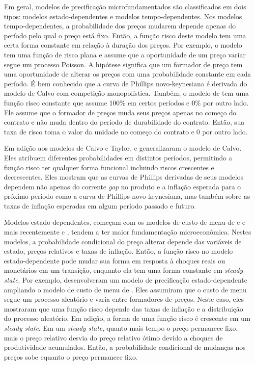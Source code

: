 \documentclass[twoside,a4paper,11pt]{report}
\begin{document}
Em geral, modelos de precificação microfundamentados são classificados em dois tipos: modelos estado-dependentes e modelos tempo-dependentes. Nos modelos tempo-dependentes, a probabilidade dos preços mudarem depende apenas do período pelo qual o preço está fixo. Então, a função risco deste modelo tem uma certa forma constante em relação à duração dos preços. Por exemplo, o modelo \citet{calvo1983staggered} tem uma função de risco plana e assume que a oportunidade de um preço variar segue um processo Poisson. A hipótese significa que um formador de preço tem uma oportunidade de alterar os preços com uma probabilidade constante em cada período. É bem conhecido que a curva de Phillips novo-keynesiana é derivada do modelo de Calvo com competição monopolística. Também, o modelo de \citet{taylor1980aggregate} tem uma função risco constante que assume 100\% em certos períodos e 0\% por outro lado. Ele assume que o formador de preços muda seus preços apenas no começo do contrato e não muda dentro do período de durabilidade do contrato. Então, sua taxa de risco toma o valor da unidade no começo do contrato e $0$ por outro lado. 

Em adição aos modelos de Calvo e Taylor, \citet{mash2003new} e \citet{coenen2007identifying} generalizaram o modelo de Calvo. Eles atribuem diferentes probabilidades em distintos períodos, permitindo a função risco ter qualquer forma funcional incluindo riscos crescentes e decrescentes. Eles mostram que as curvas de Phillips derivadas de seus modelos dependem não apenas do corrente \emph{gap} no produto e a inflação esperada para o próximo período como a curva de Phillips novo-keynesiana, mas também sobre as taxas de inflação esperadas em algum período passado e futuro. 

Modelos estado-dependentes, começam com os modelos de custo de menu de \citet{barro1972theory} e \citet{sheshinski1977inflation} e mais recentemente \citet{dotsey1999state} e \citet{golosov2007menu}, tendem a ter maior fundamentação microeconômica. Nestes modelos, a probabilidade condicional do preço alterar depende das variáveis de estado, preços relativos e taxas de inflação. Então, a função risco no modelo estado-dependente pode mudar sua forma em resposta à choques reais ou monetários em um transição, enquanto ela tem uma forma constante em \emph{steady state}. Por exemplo, \citet{dotsey1999state} desenvolveram um modelo de precificação estado-dependente ampliando o modelo de custo de menu de \citet{blanchard1987monopolistic}. Eles assumiram que o custo de menu segue um processo aleatório e varia entre formadores de preços. Neste caso, eles mostraram que uma função risco depende das taxas de inflação e a distribuição do processo aleatório. Em adição, a forma de uma função risco é crescente em um \emph{steady state}. Em um \emph{steady state}, quanto mais tempo o preço permanece fixo, mais o preço relativo desvia do preço relativo ótimo devido a choques de produtividade acumulados. Então, a probabilidade condicional de mudanças nos preços sobe equanto o preço permanece fixo. 
\end{document}
